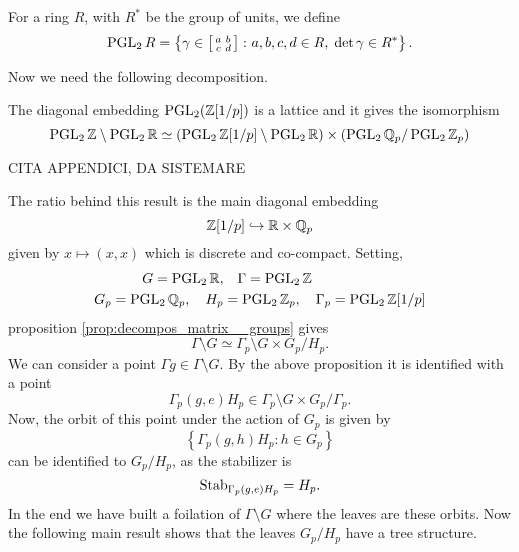 \begin{defin}
For a ring $R$, with $R^{\ast}$ be the group of units, we define 
\[
\operatorname{PGL}_{2} R=\left\{
\gamma\in\left[\begin{smallmatrix} a&b\\c&d \end{smallmatrix}\right]\colon a,b,c,d\in R,\;\det \gamma \in R^{\ast}
\right\}.
\]
\end{defin}
Now we need the following decomposition.

\begin{nprop}
\label{prop:decompos_matrix__groups}
The diagonal embedding $\operatorname{PGL}_{2}(\mathbb{Z}[1/p])$ is a lattice and it gives the isomorphism
\[
\operatorname{PGL}_{2}\mathbb{Z}\setminus\operatorname{PGL}_{2}\mathbb{R}\simeq\left(
\operatorname{PGL}_{2}\mathbb{Z}[1/p]\setminus\operatorname{PGL}_{2}\mathbb{R}
\right)\times\left(
\operatorname{PGL}_{2}\mathbb{Q}_{p}/\operatorname{PGL}_{2}\mathbb{Z}_{p}
\right)
\]
\end{nprop}
\begin{prf}
CITA APPENDICI, DA SISTEMARE
\end{prf}

The ratio behind this result is the main diagonal embedding 
\[
\mathbb{Z}[1/p]\hookrightarrow\mathbb{R}\times\mathbb{Q}_{p}
\]
given by $x\mapsto(x,x)$ which is discrete and co-compact. Setting,
\begin{align*}
G=\operatorname{PGL}_{2}\mathbb{R},&\quad\Gamma=\operatorname{PGL}_{2}\mathbb{Z}\\
G_{p}=\operatorname{PGL}_{2}\mathbb{Q}_{p},\quad H_{p}&=\operatorname{PGL}_{2}\mathbb{Z}_{p},\quad\Gamma_{p}=\operatorname{PGL}_{2}\mathbb{Z}[1/p]
\end{align*}
proposition \ref{prop:decompos_matrix__groups} gives
\[
\Gamma\setminus G\simeq \Gamma_{p}\setminus G\times G_{p}/H_{p}.
\]
We can consider a point $\Gamma g\in\Gamma\setminus G$. By the above proposition it is identified with a point
\[
\Gamma_{p}(g,e)H_{p}\in\Gamma_{p}\setminus G\times G_{p}/\Gamma_{p}.
\]
Now, the orbit of this point under the action of $G_{p}$ is given by
\[
\left\{
\Gamma_{p}(g,h)H_{p}\colon h\in G_{p}
\right\}
\]
can be identified to $G_{p}/H_{p}$, as the stabilizer is 
\[
\operatorname{Stab}_{\Gamma_{p}(g,e)H_{p}}=H_{p}.
\]
In the end we have built a foilation of $\Gamma\setminus G$ where the leaves are these orbits. Now the following main result shows that the leaves $G_{p}/H_{p}$ have a tree structure.

